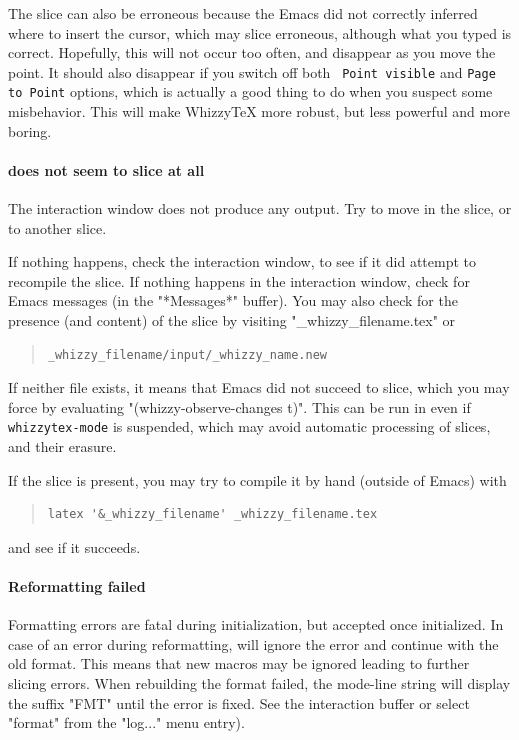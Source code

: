 \documentclass[12pt]{article}
\begin{document}
The slice can also be erroneous because the Emacs did not correctly inferred
where to insert the cursor, which may slice erroneous, although what you
typed is correct. Hopefully, this will not occur too often, and disappear as
you move the point. It should also disappear if you switch off both {\tt
Point visible} and {\tt Page to Point} options, which is actually a good
thing to do when you suspect some misbehavior.  This will make WhizzyTeX
more robust, but less powerful and more boring.

\paragraph {\whizzy\space does not seem to slice at all}

The interaction window does not produce any output.
Try to move in the slice, or to another slice.

If nothing happens, check the interaction
window, to see if it did attempt to recompile the slice.
If nothing happens in the interaction window, check for Emacs messages
(in the \lst"*Messages*" buffer). You may also check for the presence
(and content) of the slice by visiting
\lst"_whizzy_filename.tex" or
\begin{quote}
\begin{verbatim}
_whizzy_filename/input/_whizzy_name.new
\end{verbatim}
\end{quote}
If neither file exists, it means that Emacs did
not succeed to slice, which you may force by evaluating
\lst"(whizzy-observe-changes t)".
This can be run in even if {\tt whizzytex-mode} is suspended, which may
avoid automatic processing of slices, and their erasure.

If the slice is present, you may try to compile it by hand (outside of
Emacs) with
\begin{quote}
\begin{verbatim}
latex '&_whizzy_filename' _whizzy_filename.tex
\end{verbatim}
\end{quote}
and see if it succeeds.


\paragraph {Reformatting failed}

Formatting errors are fatal during initialization, but accepted once
initialized. In case of an error during reformatting, {\whizzy} will ignore
the error and continue with the old format.  This means that new macros may
be ignored leading to further slicing errors. When rebuilding the format
failed, the mode-line string will display the suffix \lst"FMT" until the
error is fixed.  See the interaction buffer or select \lst"format" from the
\lst"log..." menu entry).
\end{document}
